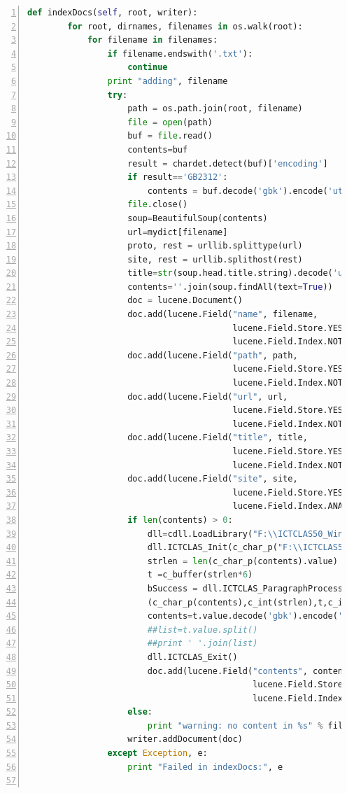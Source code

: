 \documentclass{article}
\begin{document}
\begin{lstlisting}[language=python,numbers=left,frame=leftline]
    def indexDocs(self, root, writer):
        for root, dirnames, filenames in os.walk(root):
            for filename in filenames:
                if filename.endswith('.txt'):
                    continue
                print "adding", filename
                try:
                    path = os.path.join(root, filename)
                    file = open(path)
                    buf = file.read()
                    contents=buf
                    result = chardet.detect(buf)['encoding']
                    if result=='GB2312':
                        contents = buf.decode('gbk').encode('utf8')
                    file.close()
                    soup=BeautifulSoup(contents)
                    url=mydict[filename]
                    proto, rest = urllib.splittype(url)
                    site, rest = urllib.splithost(rest)
                    title=str(soup.head.title.string).decode('utf8')
                    contents=''.join(soup.findAll(text=True))
                    doc = lucene.Document()
                    doc.add(lucene.Field("name", filename,
                                         lucene.Field.Store.YES,
                                         lucene.Field.Index.NOT_ANALYZED))
                    doc.add(lucene.Field("path", path,
                                         lucene.Field.Store.YES,
                                         lucene.Field.Index.NOT_ANALYZED))
                    doc.add(lucene.Field("url", url,
                                         lucene.Field.Store.YES,
                                         lucene.Field.Index.NOT_ANALYZED))
                    doc.add(lucene.Field("title", title,
                                         lucene.Field.Store.YES,
                                         lucene.Field.Index.NOT_ANALYZED))
                    doc.add(lucene.Field("site", site,
                                         lucene.Field.Store.YES,
                                         lucene.Field.Index.ANALYZED))
                    if len(contents) > 0:
                        dll=cdll.LoadLibrary("F:\\ICTCLAS50_Windows_32_C\ICTCLAS50.dll")
                        dll.ICTCLAS_Init(c_char_p("F:\\ICTCLAS50_Windows_32_C"))
                        strlen = len(c_char_p(contents).value)
                        t =c_buffer(strlen*6)
                        bSuccess = dll.ICTCLAS_ParagraphProcess
                        (c_char_p(contents),c_int(strlen),t,c_int(0),0)
                        contents=t.value.decode('gbk').encode('utf8')
                        ##list=t.value.split()
                        ##print ' '.join(list)
                        dll.ICTCLAS_Exit()
                        doc.add(lucene.Field("contents", contents,
                                             lucene.Field.Store.NO,
                                             lucene.Field.Index.ANALYZED))
                    else:
                        print "warning: no content in %s" % filename
                    writer.addDocument(doc)
                except Exception, e:
                    print "Failed in indexDocs:", e


\end{lstlisting}
\end{document}

